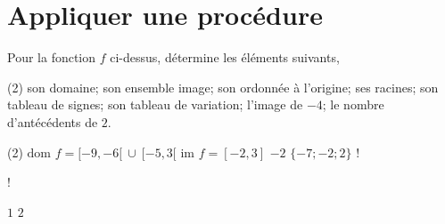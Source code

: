\documentclass[a4paper, 12pt, parskip=half-]{scrartcl}
\begin{document}
\section*{ Appliquer une procédure}
\begin{exercise}[points=10]
    \begin{center}
        
    \end{center}
    Pour la fonction $f$ ci-dessus, détermine les éléments suivants,
    \begin{tasks}(2)
        \task son domaine;
        \task son ensemble image;
        \task son ordonnée à l'origine;
        \task ses racines;
        \task son tableau de signes;
        \task son tableau de variation;
        \task l'image de $-4$;
        \task le nombre d'antécédents de $2$.
    \end{tasks}
\end{exercise}
\begin{solution}
    \begin{tasks}(2)
        \task $\textrm{dom }f=[-9,-6[~\cup~[-5,3[$
        \task $\textrm{im }f=[-2,3]$
        \task $-2$
        \task $\lbrace -7;-2;2 \rbrace$
        \task!
        \task!
        \task $1$
        \task $2$
    \end{tasks}
\end{solution}
\end{document}
